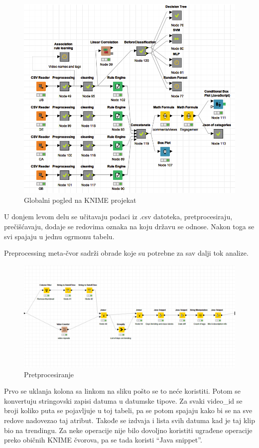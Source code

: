 \documentclass[a4paper]{article}
\theoremstyle{definition}
\begin{document}
\begin{figure}[h!]
\begin{center}
    \includegraphics[width=1\textwidth]{Global.png}
    \caption{Globalni pogled na KNIME projekat}
\end{center}
\end{figure}

U donjem levom delu se učitavaju podaci iz .csv datoteka, pretprocesiraju, prečišćavaju, dodaje se redovima oznaka na koju državu se odnose.
Nakon toga se svi spajaju u jednu ogrmonu tabelu.

Preprocessing meta-čvor sadrži obrade koje su potrebne za sav dalji tok analize.


\begin{figure}[h!]
\begin{center}
    \includegraphics[width=1\textwidth]{preprocessing.png}
    \caption{Pretprocesiranje}
\end{center}
\end{figure}
Prvo se uklanja kolona sa linkom na sliku pošto se to neće koristiti. Potom se konvertuju stringovski zapisi datuma u datumske tipove. 
Za svaki video\_id se broji koliko puta se pojavljuje u toj tabeli, pa se potom spajaju kako bi se na sve redove nadovezao taj atribut.
Takođe se izdvaja i lista svih datuma kad je taj klip bio na trendingu.
Za neke operacije nije bilo dovoljno koristiti ugrađene operacije preko običnih KNIME  čvorova, pa se tada koristi ``Java snippet''.
\end{document}
